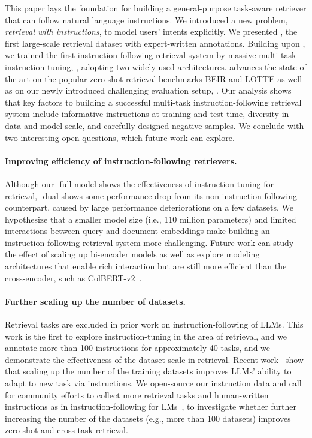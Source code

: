 {
This paper lays the foundation for building a general-purpose task-aware retriever that can follow natural language instructions. 
We introduced a new problem, \emph{retrieval with instructions}, to model users' intents explicitly.
We presented \rib, the first large-scale retrieval dataset with expert-written annotations. 
Building upon \rib, we trained the first instruction-following retrieval system by massive multi-task instruction-tuning, \model, adopting two widely used architectures. 
\model advances the state of the art on the popular zero-shot retrieval benchmarks BEIR and LOTTE as well as on our newly introduced challenging evaluation setup, \task. 
Our analysis shows that key factors to building a successful multi-task instruction-following retrieval system include informative instructions at training and test time, diversity in data and model scale, and carefully designed negative samples. 
We conclude with two interesting open questions, which future work can explore.  

{
\paragraph{Improving efficiency of instruction-following retrievers. } Although our \model-full model shows the effectiveness of instruction-tuning for retrieval, \model-dual shows some performance drop from its non-instruction-following counterpart, caused by large performance deteriorations on a few datasets. 
We hypothesize that a smaller model size (i.e., 110 million parameters) and limited interactions between query and document embeddings make building an instruction-following retrieval system more challenging. 
Future work can study the effect of scaling up bi-encoder models  as well as explore modeling architectures that enable rich interaction but are still more efficient than the cross-encoder, such as ColBERT-v2~\cite{santhanam-etal-2022-colbertv2}. 
}
}


\paragraph{Further scaling up the number of datasets.}
Retrieval tasks are excluded in prior work on instruction-following of LLMs. 
This work is the first to explore instruction-tuning in the area of retrieval, and we annotate more than 100 instructions for approximately 40 tasks, and we demonstrate the effectiveness of the dataset scale in retrieval. 
Recent work~\cite{wang2022benchmarking,flan_palm} show that scaling up the number of the training datasets improves LLMs' ability to adapt to new task via instructions. 
We open-source our instruction data and call for community efforts to collect more retrieval tasks and human-written instructions as in instruction-following for LMs~\cite{wang2022benchmarking,bach2022promptsource}, to investigate whether further increasing the number of the datasets (e.g., more than 100 datasets) improves zero-shot and cross-task retrieval. 



